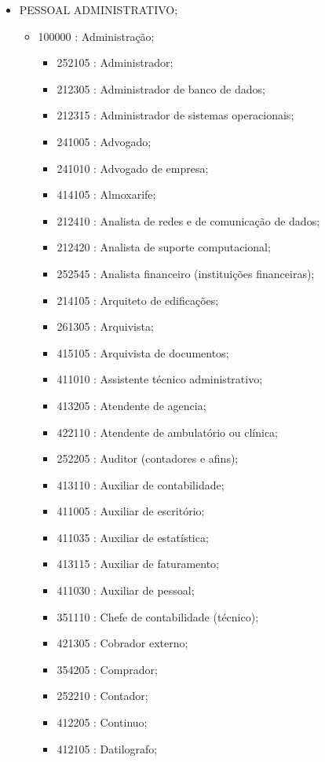 \begin{itemize}
\begin{itemize}
  \end{itemize}
  \item PESSOAL ADMINISTRATIVO;
  \begin{itemize}
    \item 100000 : Administração;
    \begin{itemize}
      \item 252105 : Administrador;
      \item 212305 : Administrador de banco de dados;
      \item 212315 : Administrador de sistemas operacionais;
      \item 241005 : Advogado;
      \item 241010 : Advogado de empresa;
      \item 414105 : Almoxarife;
      \item 212410 : Analista de redes e de comunicação de dados;
      \item 212420 : Analista de suporte computacional;
      \item 252545 : Analista financeiro (instituições financeiras);
      \item 214105 : Arquiteto de edificações;
      \item 261305 : Arquivista;
      \item 415105 : Arquivista de documentos;
      \item 411010 : Assistente técnico administrativo;
      \item 413205 : Atendente de agencia;
      \item 422110 : Atendente de ambulatório ou clínica;
      \item 252205 : Auditor (contadores e afins);
      \item 413110 : Auxiliar de contabilidade;
      \item 411005 : Auxiliar de escritório;
      \item 411035 : Auxiliar de estatística;
      \item 413115 : Auxiliar de faturamento;
      \item 411030 : Auxiliar de pessoal;
      \item 351110 : Chefe de contabilidade (técnico);
      \item 421305 : Cobrador externo;
      \item 354205 : Comprador;
      \item 252210 : Contador;
      \item 412205 : Continuo;
      \item 412105 : Datilografo;

\end{itemize}
\end{itemize}
\end{itemize}
